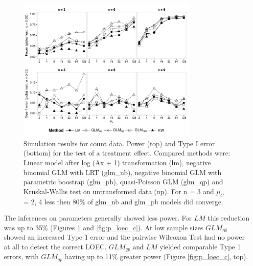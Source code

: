 \documentclass{scrartcl}
\begin{document}
\begin{figure}[h]
  \centering
  \includegraphics[width = 0.8\textwidth]{p_glob_c.pdf}
  \caption{Simulation results for count data. Power (top) and Type I error (bottom) for the test of a treatment effect. Compared methods were: Linear model after log (Ax + 1) transformation (lm), negative binomial GLM with LRT (glm\_nb), negative binomial GLM with parametric boostrap (glm\_pb), quasi-Poisson GLM (glm\_qp) and Kruskal-Wallis test on untransformed data (np).
  For n = 3 and $\mu_C$ = {2, 4} less then 80\% of glm\_nb and glm\_pb models did converge.}
  \label{fig:p_glob_c}
\end{figure}

The inferences on parameters generally showed less power.
For $LM$ this reduction was up to 35\% (Figures \ref{fig:p_glob_c} and \ref{fig:p_loec_c}).
At low sample sizes $GLM_{nb}$ showed an increased Type 1 error and the pairwise Wilcoxon Test had no power at all to detect the correct LOEC.
$GLM_{qp}$ and $LM$ yielded comparable Type 1 errors, with $GLM_{qp}$ having up to 11\% greater power (Figure \ref{fig:p_loec_c}, top).
\end{document}
